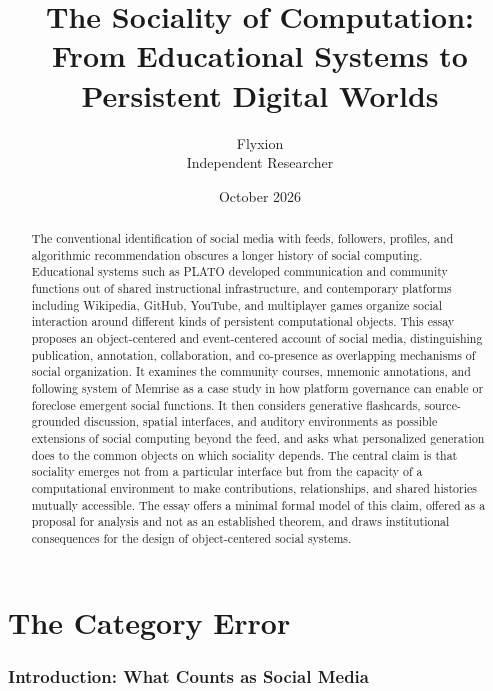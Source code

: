 \documentclass[11pt]{article}
\title{The Sociality of Computation:\\
From Educational Systems to Persistent Digital Worlds}
\author{Flyxion\\Independent Researcher}
\date{October 2026}
\theoremstyle{remark}
\begin{document}
\maketitle

\begin{abstract}
\noindent
The conventional identification of social media with feeds, followers, profiles, and algorithmic recommendation obscures a longer history of social computing. Educational systems such as PLATO developed communication and community functions out of shared instructional infrastructure, and contemporary platforms including Wikipedia, GitHub, YouTube, and multiplayer games organize social interaction around different kinds of persistent computational objects. This essay proposes an object-centered and event-centered account of social media, distinguishing publication, annotation, collaboration, and co-presence as overlapping mechanisms of social organization. It examines the community courses, mnemonic annotations, and following system of Memrise as a case study in how platform governance can enable or foreclose emergent social functions. It then considers generative flashcards, source-grounded discussion, spatial interfaces, and auditory environments as possible extensions of social computing beyond the feed, and asks what personalized generation does to the common objects on which sociality depends. The central claim is that sociality emerges not from a particular interface but from the capacity of a computational environment to make contributions, relationships, and shared histories mutually accessible. The essay offers a minimal formal model of this claim, offered as a proposal for analysis and not as an established theorem, and draws institutional consequences for the design of object-centered social systems.
\end{abstract}

\tableofcontents
\bigskip

\part{The Category Error}

\section{Introduction: What Counts as Social Media}
\end{document}

